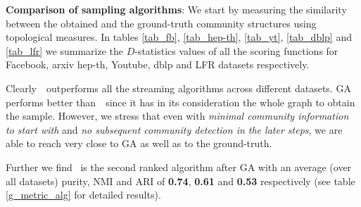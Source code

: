  {\bf Comparison of sampling algorithms}:
We start by measuring the similarity between the obtained and the ground-truth community structures using topological measures. In tables \ref{tab_fb},  \ref{tab_hep-th}, \ref{tab_yt}, \ref{tab_dblp} and \ref{tab_lfr} 
we summarize the $D$-statistics values of all the scoring functions for Facebook, arxiv hep-th, Youtube, dblp and LFR datasets respectively. 

Clearly~\compas~outperforms all the streaming algorithms across different datasets. GA performs better than~\compas~since it has in its 
consideration the whole graph to obtain the sample. However, we stress that even with {\em minimal community information to start with} and 
{\em no subsequent community detection in the later steps}, we are able to reach very close to GA as well as to the ground-truth.

Further we find \compas~is the second ranked algorithm after GA with an average 
(over all datasets) purity, NMI and ARI of {\bf 0.74}, {\bf 0.61} and {\bf 0.53} respectively (see table \ref{g_metric_alg} for detailed results). 

